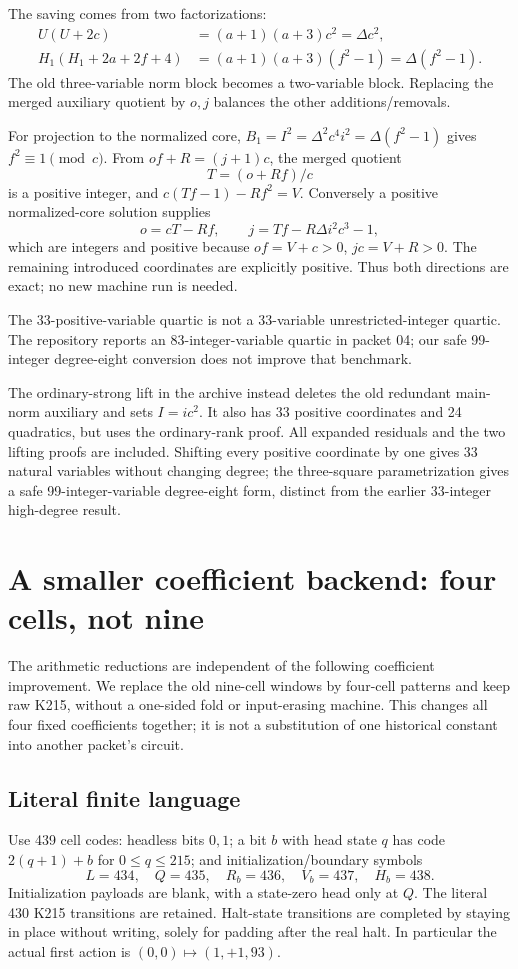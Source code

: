 \documentclass[11pt]{article}
\begin{document}
The saving comes from two factorizations:
\begin{align*}
U(U+2c)&=(a+1)(a+3)c^2=\Delta c^2,\\
H_1(H_1+2a+2f+4)&=(a+1)(a+3)(f^2-1)=\Delta(f^2-1).
\end{align*}
The old three-variable norm block becomes a two-variable block. Replacing the merged auxiliary quotient by $o,j$ balances the other additions/removals.

For projection to the normalized core, $B_1=I^2=\Delta^2c^4i^2=\Delta(f^2-1)$ gives $f^2\equiv1\pmod c$. From $of+R=(j+1)c$, the merged quotient
\[
T=(o+Rf)/c
\]
is a positive integer, and $c(Tf-1)-Rf^2=V$. Conversely a positive normalized-core solution supplies
\[
o=cT-Rf,\qquad j=Tf-R\Delta i^2c^3-1,
\]
which are integers and positive because $of=V+c>0$, $jc=V+R>0$. The remaining introduced coordinates are explicitly positive. Thus both directions are exact; no new machine run is needed.

The 33-positive-variable quartic is not a 33-variable unrestricted-integer quartic. The repository reports an 83-integer-variable quartic in packet 04; our safe 99-integer degree-eight conversion does not improve that benchmark.

The ordinary-strong lift in the archive instead deletes the old redundant main-norm auxiliary and sets $I=ic^2$. It also has 33 positive coordinates and 24 quadratics, but uses the ordinary-rank proof. All expanded residuals and the two lifting proofs are included. Shifting every positive coordinate by one gives 33 natural variables without changing degree; the three-square parametrization gives a safe 99-integer-variable degree-eight form, distinct from the earlier 33-integer high-degree result.
\section{A smaller coefficient backend: four cells, not nine}
The arithmetic reductions are independent of the following coefficient improvement. We replace the old nine-cell windows by four-cell patterns and keep raw K215, without a one-sided fold or input-erasing machine. This changes all four fixed coefficients together; it is not a substitution of one historical constant into another packet's circuit.

\subsection{Literal finite language}
Use 439 cell codes: headless bits $0,1$; a bit $b$ with head state $q$ has code $2(q+1)+b$ for $0\le q\le215$; and initialization/boundary symbols
\[
L=434,\quad Q=435,\quad R_b=436,\quad V_b=437,\quad H_b=438.
\]
Initialization payloads are blank, with a state-zero head only at $Q$. The literal 430 K215 transitions are retained. Halt-state transitions are completed by staying in place without writing, solely for padding after the real halt. In particular the actual first action is $(0,0)\mapsto(1,+1,93)$.
\end{document}
